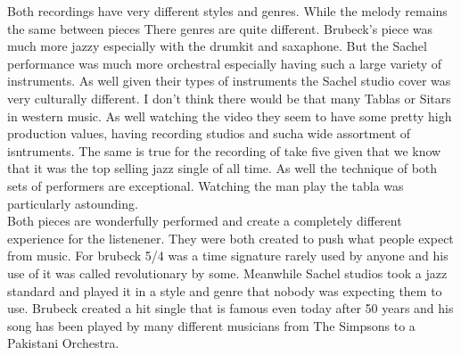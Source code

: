 \documentclass{article}
\begin{document}
Both recordings have very different styles and genres. While the melody remains
the same between pieces There genres are quite different. Brubeck's piece was
much more jazzy especially with the drumkit and saxaphone. But the Sachel
performance was much more orchestral especially having such a large variety of
instruments. As well given their types of instruments the Sachel studio cover
was very culturally different. I don't think there would be that many Tablas or
Sitars in western music. As well watching the video they seem to have some
pretty high production values, having recording studios and sucha wide
assortment of isntruments. The same is true for the recording of take five given
that we know that it was the top selling jazz single of all time. As well the
technique of both sets of performers are exceptional. Watching the man play the
tabla was particularly astounding.\\

Both pieces are wonderfully performed and create a completely different
experience for the listenener. They were both created to push what people expect
from music. For brubeck 5/4 was a time signature rarely used by anyone and his
use of it was called revolutionary by some. Meanwhile Sachel studios took a jazz
standard and played it in a style and genre that nobody was expecting them to
use. Brubeck created a hit single that is famous even today after 50 years and
his song has been played by many different musicians from The Simpsons to a
Pakistani Orchestra.\\
\end{document}

